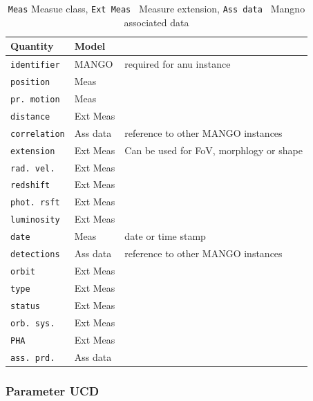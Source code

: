 \documentclass[11pt,a4paper]{ivoa}
\begin{document}
\begin{table}[ht!]
     \tiny
     \begin{tabular}{|p{2.4cm}|p{1.8cm}|p{7cm}|}
       \hline Quantity &  Model &  \\
       \hline  \texttt{identifier}      & MANGO & required for anu instance\\
       \hline  \texttt{position}      &  Meas &  \\
       \hline  \texttt{pr. motion}   & Meas &     \\
       \hline  \texttt{distance}     & Ext Meas &     \\
       \hline  \texttt{correlation}   & Ass data & reference to other MANGO instances     \\
       \hline  \texttt{extension}     & Ext Meas & Can be used for FoV, morphlogy or shape\\
       \hline  \texttt{rad. vel.}       &  Ext Meas  &       \\
       \hline  \texttt{redshift}        &   Ext Meas  &  \\
       \hline  \texttt{phot. rsft}      & Ext Meas&    \\
       \hline  \texttt{luminosity}    & Ext Meas&\\
       \hline  \texttt{date}             & Meas & date or time stamp\\
       \hline  \texttt{detections}    & Ass data & reference to other MANGO instances   \\
       \hline  \texttt{orbit}             & Ext Meas&      \\
       \hline  \texttt{type}             &Ext Meas&     \\
       \hline  \texttt{status}          &Ext Meas&     \\
       \hline  \texttt{orb. sys.}      &Ext Meas&     \\
       \hline  \texttt{PHA}            &Ext Meas&     \\
       \hline  \texttt{ass. prd.}     &Ass data&  \\
       \hline
     \end{tabular}
     \caption{ \texttt{Meas} Measue class, \texttt{Ext Meas } Measure extension, \texttt{Ass data  } Mangno associated data}
 \end{table}


\subsubsection{Parameter UCD}
\end{document}
